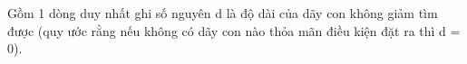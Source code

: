 Gồm 1 dòng duy nhất ghi số nguyên d là độ dài của dãy con không giảm tìm được (quy ước rằng nếu không có dãy con nào thỏa mãn điều kiện đặt ra thì d = 0).

\
